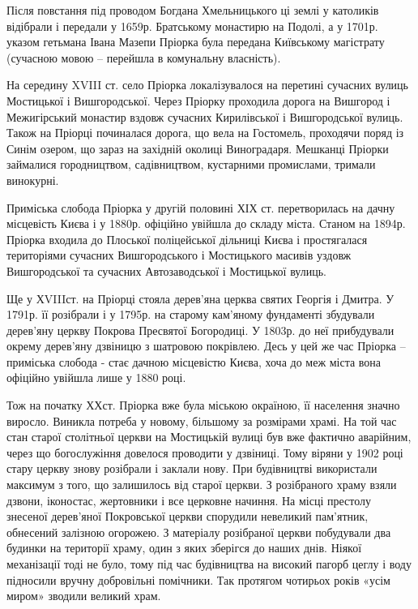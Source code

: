 
Після повстання під проводом Богдана Хмельницького ці землі у католиків
відібрали і передали у 1659р. Братському монастирю на Подолі, а у 1701р. указом
гетьмана Івана Мазепи Пріорка була передана Київському магістрату (сучасною
мовою – перейшла в комунальну власність). 

На середину XVIII ст. село Пріорка локалізувалося на перетині сучасних вулиць
Мостицької і Вишгородської. Через Пріорку проходила дорога на Вишгород і
Межигірський монастир вздовж сучасних Кирилівської і Вишгородської вулиць.
Також на Пріорці починалася дорога, що вела на Гостомель, проходячи поряд із
Синім озером, що зараз на західній околиці Виноградаря. Мешканці Пріорки
займалися городництвом, садівництвом, кустарними промислами, тримали винокурні. 


Приміська слобода Пріорка у другій половині ХІХ ст. перетворилась на дачну
місцевість Києва і у 1880р. офіційно увійшла до складу міста. Станом на
1894р. Пріорка входила до Плоської поліцейської дільниці Києва і
простягалася територіями сучасних Вишгородського і Мостицького масивів
уздовж Вишгородської та сучасних Автозаводської і Мостицької вулиць. 

Ще у ХVIIIст. на Пріорці стояла дерев’яна церква святих Георгія і Дмитра. У
1791р. її розібрали і у 1795р. на старому кам’яному фундаменті збудували
дерев’яну церкву Покрова Пресвятої Богородиці. У 1803р. до неї прибудували
окрему дерев’яну дзвіницю з шатровою покрівлею. Десь у цей же час Пріорка –
приміська слобода - стає дачною місцевістю Києва, хоча до меж міста вона
офіційно увійшла лише у 1880 році. 


Тож на початку ХХст. Пріорка вже була міською окраїною, її населення значно
виросло. Виникла потреба у новому, більшому за розмірами храмі. На той час
стан старої столітньої церкви на Мостицькій вулиці був вже фактично
аварійним, через що богослужіння довелося проводити у дзвіниці. Тому віряни
у 1902 році стару церкву знову розібрали і заклали нову. При будівництві
використали максимум з того, що залишилось від старої церкви. З розібраного
храму взяли дзвони, іконостас, жертовники і все церковне начиння. На місці
престолу знесеної дерев’яної Покровської церкви спорудили невеликий
пам’ятник, обнесений залізною огорожею. З матеріалу розібраної церкви
побудували два будинки на території храму, один з яких зберігся до наших
днів. Ніякої механізації тоді не було, тому під час будівництва на високий
пагорб цеглу і воду підносили вручну добровільні помічники. Так протягом
чотирьох років «усім миром» зводили великий храм. 

